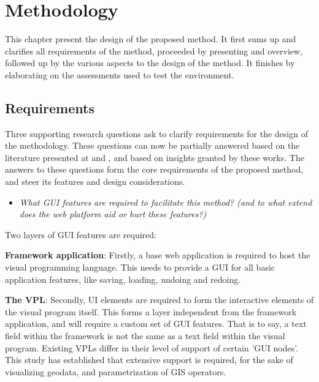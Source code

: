 \chapter{Methodology}
\label{chap:methodology}

This chapter present the design of the proposed method. 
It first sums up and clarifies all requirements of the method, proceeded by presenting and overview, followed up by the various aspects to the design of the method. 
It finishes by elaborating on the assessments used to test the environment. 


\section{Requirements}
\label{sec:method:require}

Three supporting research questions ask to clarify requirements for the design of the methodology. 
These questions can now be partially answered based on the literature presented at  and , and based on insights granted by these works.
The answers to these questions form the core requirements of the proposed method, and steer its features and design considerations.

\begin{itemize}[ ]
  \item \emph{What GUI features are required to facilitate this method? (and to what extend does the
  web platform aid or hurt these features?)}  
\end{itemize}

Two layers of \ac{GUI} features are required:

\textbf{Framework application}: Firstly, a base web application is required to host the visual programming language.
This needs to provide a \ac{GUI} for all basic application features, like saving, loading, undoing and redoing.

\textbf{The VPL}: Secondly, UI elements are required to form the interactive elements of the visual program itself. 
This forms a layer independent from the framework application, and will require a custom set of \ac{GUI} features. 
That is to say, a text field within the framework is not the same as a text field within the visual program.
Existing VPLs differ in their level of support of certain '\ac{GUI} nodes'.
This study has established that extensive support is required, for the sake of visualizing geodata, and parametrization of \ac{GIS} operators.

